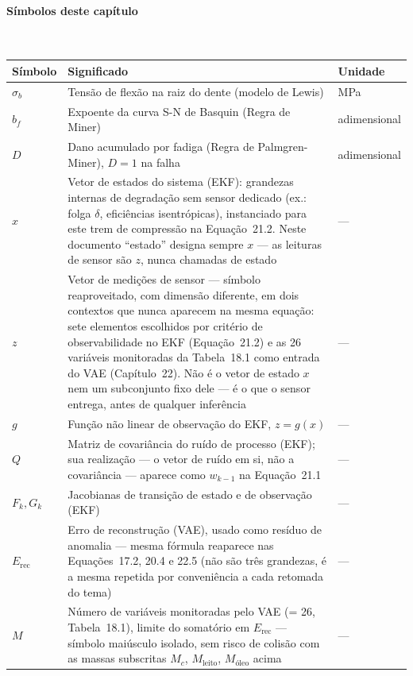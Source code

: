 \documentclass[12pt,a4paper]{article}
\numberwithin{equation}{section}
\numberwithin{table}{section}
\numberwithin{figure}{section}
\begin{document}
\paragraph{Símbolos deste capítulo}\mbox{}\\[-0.5em]
{\small
\begin{longtable}{>{\raggedright\arraybackslash}p{2.6cm} >{\raggedright\arraybackslash}p{9.2cm} >{\raggedright\arraybackslash}p{2.6cm}}
	\toprule
	\textbf{Símbolo} & \textbf{Significado} & \textbf{Unidade} \\ \midrule
	\endhead
	$\sigma_b$ & Tensão de flexão na raiz do dente (modelo de Lewis) & MPa \\
	$b_f$\dag & Expoente da curva S-N de Basquin (Regra de Miner) & adimensional \\
	$D$ & Dano acumulado por fadiga (Regra de Palmgren-Miner), $D=1$ na falha & adimensional \\
	$x$ & Vetor de estados do sistema (EKF): grandezas internas de degradação sem sensor dedicado (ex.: folga $\delta$, eficiências isentrópicas), instanciado para este trem de compressão na Equação~21.2. Neste documento ``estado'' designa sempre $x$ — as leituras de sensor são $z$, nunca chamadas de estado & --- \\
	$z$ & Vetor de medições de sensor — símbolo reaproveitado, com dimensão diferente, em dois contextos que nunca aparecem na mesma equação: sete elementos escolhidos por critério de observabilidade no EKF (Equação~21.2) e as 26 variáveis monitoradas da Tabela~18.1 como entrada do VAE (Capítulo~22). Não é o vetor de estado $x$ nem um subconjunto fixo dele — é o que o sensor entrega, antes de qualquer inferência & --- \\
	$g$\dag & Função não linear de observação do EKF, $z=g(x)$ & --- \\
	$Q$ & Matriz de covariância do ruído de processo (EKF); sua realização — o vetor de ruído em si, não a covariância — aparece como $w_{k-1}$ na Equação~21.1 & --- \\
	$F_k, G_k$ & Jacobianas de transição de estado e de observação (EKF) & --- \\
	$E_{\text{rec}}$ & Erro de reconstrução (VAE), usado como resíduo de anomalia — mesma fórmula reaparece nas Equações~17.2, 20.4 e 22.5 (não são três grandezas, é a mesma repetida por conveniência a cada retomada do tema) & --- \\
	$M$ & Número de variáveis monitoradas pelo VAE (= 26, Tabela~18.1), limite do somatório em $E_{\text{rec}}$ — símbolo maiúsculo isolado, sem risco de colisão com as massas subscritas $M_c$, $M_{\text{leito}}$, $M_{\text{óleo}}$ acima & --- \\

\end{longtable}}
\end{document}
